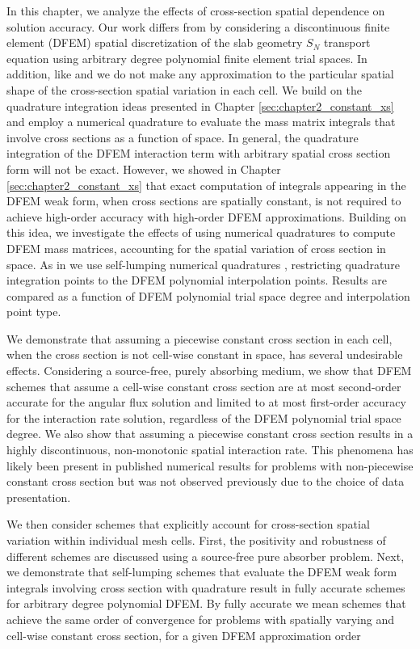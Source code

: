In this chapter, we analyze the effects of cross-section spatial dependence on solution accuracy.
Our work differs from \cite{varXS_diff,varXS_MOC,adams_scb,adams_nowak} by considering a discontinuous finite element (DFEM) spatial discretization of the slab geometry $S_N$ transport equation using arbitrary degree polynomial finite element trial spaces.  
In addition, like \cite{adams_scb} and \cite{adams_nowak} we do not make any approximation to the particular spatial shape of the cross-section spatial variation in each cell.
We build on the quadrature integration ideas presented in Chapter \ref{sec:chapter2_constant_xs} and employ a numerical quadrature to evaluate the mass matrix integrals that involve cross sections as a function of space.
In general, the quadrature integration of the DFEM interaction term with arbitrary spatial cross section form will not be exact.
However, we showed in Chapter \ref{sec:chapter2_constant_xs} that exact computation of integrals appearing in the DFEM weak form, when cross sections are spatially constant, is not required to achieve high-order accuracy with high-order DFEM approximations.  
Building on this idea, we investigate the effects of using numerical quadratures to compute DFEM mass matrices, accounting for the spatial variation of cross section in space.
As in  we use self-lumping numerical quadratures \cite{raviart, thomee}, restricting quadrature integration points to the DFEM polynomial interpolation points.
Results are compared as a function of DFEM polynomial trial space degree and interpolation point type.

We demonstrate that assuming a piecewise constant cross section in each cell, when the cross section is not cell-wise constant in space, has several undesirable effects.  
Considering a source-free, purely absorbing medium, we show that DFEM schemes that assume a cell-wise constant cross section are at most second-order accurate for the angular flux solution and limited to at most first-order accuracy for the interaction rate solution, regardless of the DFEM polynomial trial space degree.  
We also show that assuming a piecewise constant cross section results in a highly discontinuous, non-monotonic spatial interaction rate.  
This phenomena has likely been present in published numerical results for problems with non-piecewise constant cross section but was not observed previously due to the choice of data presentation.

We then consider schemes that explicitly account for cross-section spatial variation within individual mesh cells.
First, the positivity and robustness of different schemes are discussed using a source-free pure absorber problem.
Next, we demonstrate that self-lumping schemes that evaluate the DFEM weak form integrals involving cross section with quadrature 
result in fully accurate schemes for arbitrary degree polynomial DFEM. 
By fully accurate we mean schemes that achieve the same order of convergence for problems with spatially varying and cell-wise constant cross section, for a given DFEM approximation order

